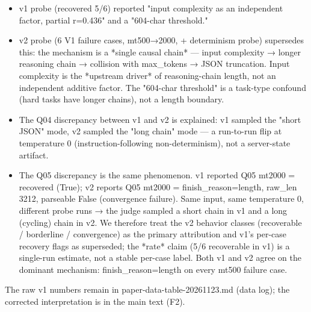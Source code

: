 \documentclass[10pt,twocolumn]{article}
\begin{document}
\begin{itemize}
  \item v1 probe (recovered 5/6) reported "input complexity as an independent factor, partial r=0.436" and a "604-char threshold."
  \item v2 probe (6 V1 failure cases, mt500→2000, + determinism probe) supersedes this: the mechanism is a *single causal chain* — input complexity → longer reasoning chain → collision with max\_tokens → JSON truncation. Input complexity is the *upstream driver* of reasoning-chain length, not an independent additive factor. The "604-char threshold" is a task-type confound (hard tasks have longer chains), not a length boundary.
  \item The Q04 discrepancy between v1 and v2 is explained: v1 sampled the "short JSON" mode, v2 sampled the "long chain" mode — a run-to-run flip at temperature 0 (instruction-following non-determinism), not a server-state artifact.
  \item The Q05 discrepancy is the same phenomenon. v1 reported Q05 mt2000 = recovered (True); v2 reports Q05 mt2000 = finish\_reason=length, raw\_len 3212, parseable False (convergence failure). Same input, same temperature 0, different probe runs → the judge sampled a short chain in v1 and a long (cycling) chain in v2. We therefore treat the v2 behavior classes (recoverable / borderline / convergence) as the primary attribution and v1's per-case recovery flags as superseded; the *rate* claim (5/6 recoverable in v1) is a single-run estimate, not a stable per-case label. Both v1 and v2 agree on the dominant mechanism: finish\_reason=length on every mt500 failure case.
\end{itemize}


The raw v1 numbers remain in paper-data-table-20261123.md (data log); the corrected interpretation is in the main text (F2).
\end{document}
